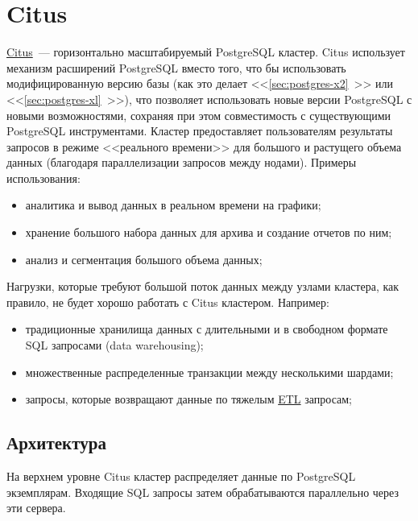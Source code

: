 \section{Citus}
\label{sec:citus}

\href{https://www.citusdata.com/}{Citus}~--- горизонтально масштабируемый PostgreSQL кластер. Citus использует механизм расширений PostgreSQL вместо того, что бы использовать модифицированную версию базы (как это делает <<\ref{sec:postgres-x2}~>> или <<\ref{sec:postgres-xl}~>>), что позволяет использовать новые версии PostgreSQL с новыми возможностями, сохраняя при этом совместимость с существующими PostgreSQL инструментами. Кластер предоставляет пользователям результаты запросов в режиме <<реального времени>> для большого и растущего объема данных (благодаря параллелизации запросов между нодами). Примеры использования:

\begin{itemize}
  \item аналитика и вывод данных в реальном времени на графики;
  \item хранение большого набора данных для архива и создание отчетов по ним;
  \item анализ и сегментация большого объема данных;
\end{itemize}

Нагрузки, которые требуют большой поток данных между узлами кластера, как правило, не будет хорошо работать с Citus кластером. Например:

\begin{itemize}
  \item традиционные хранилища данных с длительными и в свободном формате SQL запросами (data warehousing);
  \item множественные распределенные транзакции между несколькими шардами;
  \item запросы, которые возвращают данные по тяжелым \href{https://ru.wikipedia.org/wiki/ETL}{ETL} запросам;
\end{itemize}



\subsection{Архитектура}

На верхнем уровне Citus кластер распределяет данные по PostgreSQL экземплярам. Входящие SQL запросы затем обрабатываются параллельно через эти сервера.

